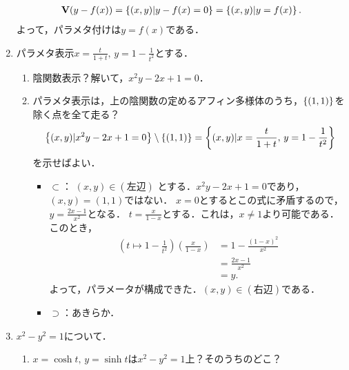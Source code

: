 \documentclass[9pt]{ltjsarticle}
\begin{document}
\begin{enumerate}[label=(問題\arabic*)]
\begin{align}
 \textbf V(y-f(x)) = \left\{(x,y) | y-f(x)=0\right\} = \left\{(x,y)| y=f(x)\right\}.
\end{align}
よって，パラメタ付けは$y=f(x)$である．
 \item パラメタ表示$x=\frac{t}{1+t},\, y=1-\frac{1}{t^2}$とする．
\begin{enumerate}[label=(\alph*)]
 \item 陰関数表示？解いて，$x^2y-2x+1=0$．
 \item パラメタ表示は，上の陰関数の定めるアフィン多様体のうち，$\left\{(1,1)\right\}$を除く点を全て走る？
\begin{align}
 \left\{(x,y)| x^2y-2x+1=0\right\}\setminus\left\{(1,1)\right\}
= \left\{(x,y) | x=\frac{t}{1+t},\, y = 1-\frac{1}{t^2}\right\}
\end{align}
を示せばよい．
\begin{itemize}
 \item $\subset$：
$(x,y)\in (左辺)$      とする．$x^2y-2x+1=0$であり，$(x,y)=(1,1)$ではない．
$x=0$とするとこの式に矛盾するので，$y=\frac{2x-1}{x^2}$となる．
$t=\frac{x}{1-x}$とする．これは，$x\neq 1$より可能である．
このとき，
\begin{align}
 (t\mapsto 1-\frac{1}{t^2})(\frac{x}{1-x})
&=
1-\frac{(1-x)^2}{x^2}\\
 & =
\frac{2x-1}{x^2}\\
 & =
y.
\end{align}
よって，パラメータが構成できた．$(x,y)\in (右辺)$である．
 \item $\supset$：あきらか．
\end{itemize}
\end{enumerate}
 \item $x^2-y^2=1$について．
\begin{enumerate}[label=(\alph*)]
 \item $x=\cosh t,\, y=\sinh t$は$x^2-y^2=1$上？そのうちのどこ？

\end{enumerate}
\end{enumerate}
\end{document}
